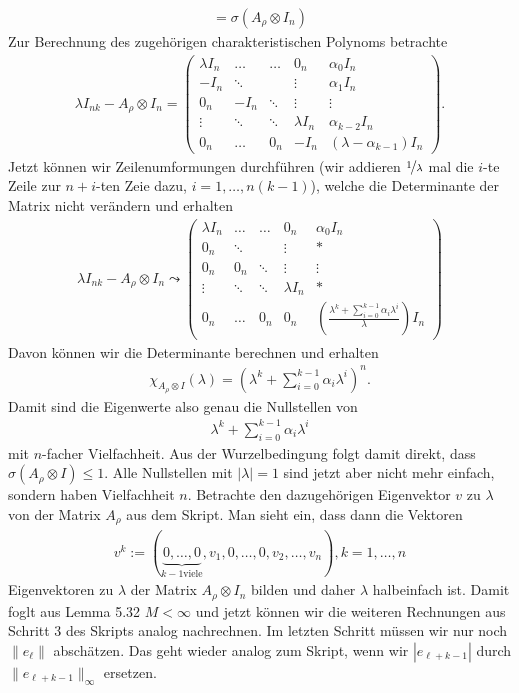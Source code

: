 \begin{solution}
\begin{align*}
  = \sigma(A_{\rho} \otimes I_n)
\end{align*}
Zur Berechnung des zugehörigen charakteristischen Polynoms betrachte
\begin{align*}
\lambda I_{nk} - A_{\rho} \otimes I_n = \begin{pmatrix}
\lambda I_n & \hdots & \hdots & 0_n & \alpha_0I_n \\
-I_n & \ddots & & \vdots & \alpha_1I_n \\
0_n & -I_n & \ddots & \vdots & \vdots \\
\vdots & \ddots & \ddots & \lambda I_n & \alpha_{k-2}I_n \\
0_n & \hdots & 0_n & -I_n & (\lambda-  \alpha_{k-1})I_n
\end{pmatrix}.
\end{align*}
Jetzt können wir Zeilenumformungen durchführen
(wir addieren $\nicefrac{1}{\lambda}$ mal die $i$-te Zeile zur $n+i$-ten Zeie dazu, $i = 1,\dots,n(k-1)$), welche die Determinante der
Matrix nicht verändern und erhalten
\begin{align*}
  \lambda I_{nk} - A_{\rho} \otimes I_n \leadsto
  \begin{pmatrix}
  \lambda I_n & \hdots & \hdots & 0_n & \alpha_0I_n \\
  0_n & \ddots & & \vdots & * \\
  0_n & 0_n & \ddots & \vdots & \vdots \\
  \vdots & \ddots & \ddots & \lambda I_n & * \\
  0_n & \hdots & 0_n & 0_n & (\frac{\lambda^k + \sum_{i = 0}^{k-1}\alpha_i\lambda^i}{\lambda})I_n
  \end{pmatrix}
\end{align*}
Davon können wir die Determinante berechnen und erhalten
\begin{align*}
  \chi_{A_{\rho} \otimes I}(\lambda) =
  \left(\lambda^k + \sum_{i = 0}^{k-1}\alpha_i\lambda^i\right)^n.
\end{align*}
Damit sind die Eigenwerte also genau die Nullstellen von
\begin{align*}
  \lambda^k + \sum_{i = 0}^{k-1}\alpha_i\lambda^i
\end{align*}
mit $n$-facher Vielfachheit. Aus der Wurzelbedingung folgt damit direkt, dass
$\sigma(A_{\rho} \otimes I) \leq 1$. Alle Nullstellen mit $|\lambda| = 1$
sind jetzt aber nicht mehr einfach, sondern haben Vielfachheit $n$.
Betrachte den dazugehörigen Eigenvektor $v$ zu $\lambda$ von der Matrix $A_{\rho}$ aus dem Skript.
Man sieht ein, dass dann die Vektoren
\begin{align*}
  v^k := (\underbrace{0,\dots,0}_{k -1 \text{viele}},v_1,0,\dots,0,v_2,\dots,v_n), k = 1,\dots,n
\end{align*}
Eigenvektoren zu $\lambda$ der Matrix $A_{\rho} \otimes I_n$ bilden und daher
$\lambda$ halbeinfach ist. Damit foglt aus Lemma 5.32 $M < \infty$ und jetzt können
wir die weiteren Rechnungen aus Schritt 3 des Skripts analog nachrechnen.
Im letzten Schritt müssen wir nur noch $\|e_{\ell}\|$ abschätzen.
Das geht wieder analog zum Skript, wenn wir $|e_{\ell + k  - 1}|$
durch $\|e_{\ell + k  - 1}\|_{\infty}$ ersetzen.
\end{solution}
